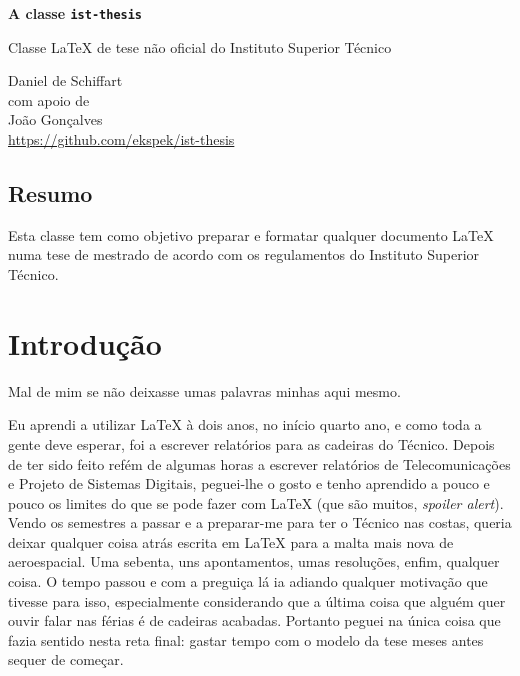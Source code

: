 \documentclass{../ist-thesis}
\begin{document}
\begin{center}
	{\Huge\bfseries A classe \texttt{ist-thesis}}
	\par\bigskip
	{\Large Classe \LaTeX{} de tese não oficial do Instituto Superior Técnico}
	\par\bigskip\smallskip
	Daniel de Schiffart \\
	{\small com apoio de} \\
	{João Gonçalves \\}
	\url{https://github.com/ekspek/ist-thesis}
\end{center}

\bigskip\bigskip

\begin{center}
	\section*{Resumo}
\end{center}
Esta classe tem como objetivo preparar e formatar qualquer documento \LaTeX{} numa tese de mestrado de acordo com os regulamentos do Instituto Superior Técnico.

\tableofcontents

\clearpage

\section*{Introdução}

Mal de mim se não deixasse umas palavras minhas aqui mesmo.

Eu aprendi a utilizar \LaTeX{} à dois anos, no início quarto ano, e como toda a gente deve esperar, foi a escrever relatórios para as cadeiras do Técnico. Depois de ter sido feito refém de algumas horas a escrever relatórios de Telecomunicações e Projeto de Sistemas Digitais, peguei-lhe o gosto e tenho aprendido a pouco e pouco os limites do que se pode fazer com \LaTeX{} (que são muitos, \textit{spoiler alert}). Vendo os semestres a passar e a preparar-me para ter o Técnico nas costas, queria deixar qualquer coisa atrás escrita em \LaTeX{} para a malta mais nova de aeroespacial. Uma sebenta, uns apontamentos, umas resoluções, enfim, qualquer coisa. O tempo passou e com a preguiça lá ia adiando qualquer motivação que tivesse para isso, especialmente considerando que a última coisa que alguém quer ouvir falar nas férias é de cadeiras acabadas. Portanto peguei na única coisa que fazia sentido nesta reta final: gastar tempo com o modelo da tese meses antes sequer de começar.
\end{document}
